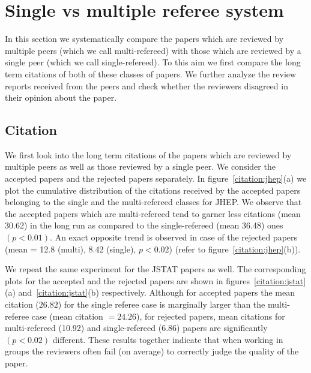 \noindent
\section{Single vs multiple referee system}
\label{mvs}
In this section we systematically compare the papers which are reviewed by multiple peers (which we call multi-refereed) with those which are reviewed by a single peer 
(which we call single-refereed). 
To this aim 
we first compare the long term citations of both of these classes of papers. We further analyze the review reports received from the peers and check whether 
the reviewers disagreed in their opinion about the paper. 

\subsection{Citation}

We first look into the long term citations of the papers which are reviewed by multiple peers as well as those reviewed by a single peer. 
We consider the accepted papers and the rejected papers separately. 
In figure~\ref{citation:jhep}(a) we plot the cumulative distribution of the citations received by the accepted papers belonging to the single and the multi-refereed classes 
for JHEP. 
We observe that the accepted papers which are multi-refereed tend to garner less citations (mean 30.62) in the long run as compared to the single-refereed 
(mean 36.48) ones $(p < 0.01)$. 
An exact opposite trend is observed in case of the rejected papers (mean = 12.8 (multi), 8.42 (single),  $p< 0.02$) (refer to figure~\ref{citation:jhep}(b)). 

We repeat the same experiment for the JSTAT papers as well. The corresponding plots for the accepted and the rejected papers are shown in 
figures~\ref{citation:jstat}(a) and~\ref{citation:jstat}(b) respectively. Although for accepted papers the mean citation ($26.82$) for the single referee 
case is marginally larger than the 
multi-referee case (mean citation $= 24.26$), for rejected papers,    
mean citations for multi-refereed (10.92) and single-refereed (6.86) papers are significantly $(p < 0.02)$ different.
These results together 
indicate that when working in groups the reviewers often fail (on average) to correctly judge the quality of the paper.

